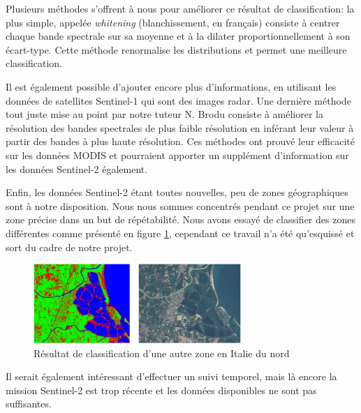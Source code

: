 \documentclass[a4paper,10pt]{article}
\begin{document}
Plusieurs méthodes s'offrent à nous pour améliorer ce résultat de classification: la plus simple, appelée \textit{whitening} (blanchissement, en français) consiste à centrer chaque bande spectrale sur sa moyenne et à la dilater proportionnellement à son écart-type. Cette méthode renormalise les distributions et permet une meilleure classification.

Il est également possible d'ajouter encore plus d'informations, en utilisant les données de satellites Sentinel-1 qui sont des images radar. Une dernière méthode tout juste mise au point par notre tuteur N. Brodu consiste à améliorer la résolution des bandes spectrales de plus faible résolution en inférant leur valeur à partir des bandes à plus haute résolution. Ces méthodes ont prouvé leur efficacité sur les données MODIS et pourraient apporter un supplément d'information sur les données Sentinel-2 également.

Enfin, les données Sentinel-2 étant toutes nouvelles, peu de zones géographiques sont à notre disposition. Nous nous sommes concentrés pendant ce projet sur une zone précise dans un but de répétabilité. Nous avons essayé de classifier des zones différentes comme présenté en figure \ref{fig:zone2}, cependant ce travail n'a été qu'esquissé et sort du cadre de notre projet.

\begin{figure}[H]
  \centering
    \includegraphics[width=0.7\textwidth]{zone2}
  \caption{Résultat de classification d'une autre zone en Italie du nord}
  \label{fig:zone2}
\end{figure}

Il serait également intéressant d'effectuer un suivi temporel, mais là encore la mission Sentinel-2 est trop récente et les données disponibles ne sont pas suffisantes. 




\end{document}
